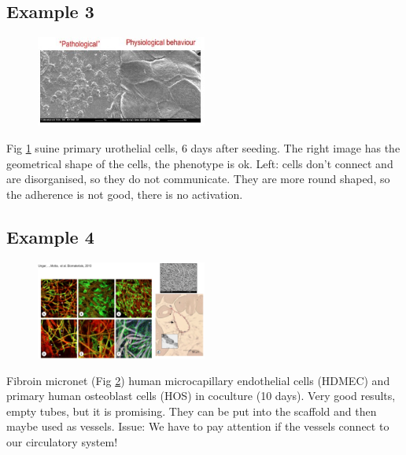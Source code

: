 \subsection{Example 3}
\begin{figure}[h]
\centering
\includegraphics[width=0.5\textwidth]{suine.jpg}
\caption{\label{fig:suine}}
\end{figure}
Fig \ref{fig:suine} suine primary urothelial cells, 6 days after seeding.
The right image has the geometrical shape of the cells, the phenotype is ok.
Left: cells don’t connect and are disorganised, so they do not communicate.
They are more round shaped, so the adherence is not good, there is no activation.

\subsection{Example 4}
\begin{figure}[h]
\centering
\includegraphics[width=0.5\textwidth]{fibroin}
\caption{\label{fig:fibroin}}
\end{figure}
Fibroin micronet (Fig \ref{fig:fibroin}) human microcapillary endothelial cells (HDMEC) and primary human osteoblast cells (HOS) in coculture (10 days). Very good results, empty tubes, but it is promising. They can be put into the scaffold and then maybe used as vessels. Issue: We have to pay attention if the vessels connect to our circulatory system!

